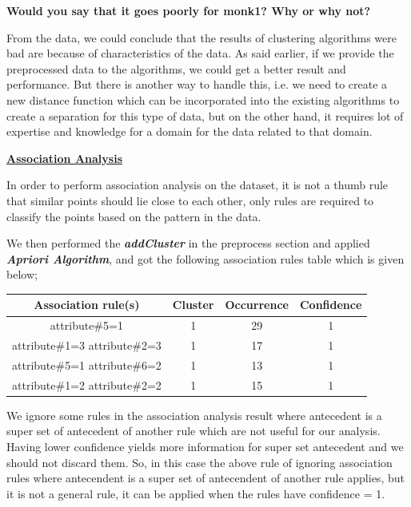 \documentclass[a4paper,10pt]{article}
\begin{document}
\par
\textbf{Would you say that it goes poorly for monk1? Why or why not?} \par
From the data, we could conclude that the results of clustering algorithms were bad are because of
characteristics of the data. As said earlier, if we provide the preprocessed data to the algorithms,
we could get a better result and performance. But there is another way to handle this, i.e. we need 
to create a new distance function which can be incorporated into the existing algorithms to create
a separation for this type of data, but on the other hand, it requires lot of expertise and knowledge
for a domain for the data related to that domain.
\par
\textbf{\underline{Association Analysis}} \par
In order to perform association analysis on the dataset, it is not a thumb rule that similar points 
should lie close to each other, only rules are required to classify the points based on the pattern
in the data. \par

We then performed the \textbf{\textit{addCluster}} in the preprocess section and applied \textbf{\textit{Apriori 
Algorithm}}, and got the following association rules table which is given below; \par
\begin{center}
  \begin{tabular}{|c|c|c|c|}
    \hline
    \textbf{Association rule(s)} & \textbf{Cluster} & \textbf{Occurrence} & \textbf{Confidence} \\
    \hline
    attribute\#5=1 & 1 & 29 & 1 \\
    \hline
    attribute\#1=3 attribute\#2=3 & 1 & 17 & 1 \\
    \hline
    attribute\#5=1 attribute\#6=2 & 1 & 13 & 1 \\
    \hline
    attribute\#1=2 attribute\#2=2 & 1 & 15 & 1 \\
    \hline
  \end{tabular}
\end{center}
\par
We ignore some rules in the association analysis result where antecedent is a super set of antecedent of
another rule which are not useful for our analysis. Having lower confidence yields more information for
super set antecedent and we should not discard them. So, in this case the above rule of ignoring 
association rules where antecendent is a super set of antecendent of another rule applies, but it is not a
general rule, it can be applied when the rules have confidence = 1.
\end{document}

